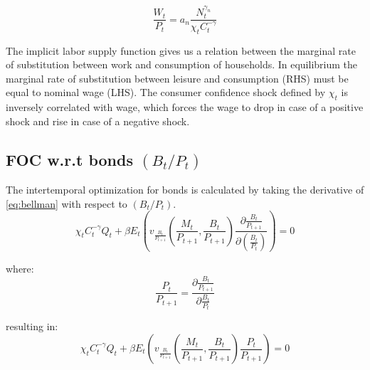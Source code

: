 \documentclass[10pt,a4paper]{article}
\begin{document}
\begin{equation}\label{eq:implicitLabor} 
\dfrac{W_{t}}{P_{t}} 
= 
a_{n} \dfrac{N_{t}^{\gamma_{n}}}{\chi_{t} C_{t}^{-\gamma}}
\end{equation}

The implicit labor supply function gives us a relation between the marginal rate of substitution between work and consumption of households. In equilibrium the marginal rate of substitution between leisure and consumption (RHS) must be equal to nominal wage (LHS). The consumer confidence shock defined by $\chi_{t}$ is inversely correlated with wage, which forces the wage to drop in case of a positive shock and rise in case of a negative shock.
\subsection{FOC w.r.t bonds $(B_{t}/P_{t})$}
The intertemporal optimization for bonds is calculated by taking the derivative of \eqref{eq:bellman} with respect to $(B_{t}/P_{t})$.
$$\chi_t C_t^{-\gamma} Q_{t} + \beta E_{t} \left( v_{\frac{B_t}{P_{t+1}}} \left(  \frac{M_t}{P_{t+1}}, \frac{B_t}{P_{t+1}}\right) \frac{\partial \frac{B_t}{P_{t+1}}}{\partial (\frac{B_t}{P_t})} \right)=0 $$

where:
$$ \frac{P_t}{P_{t+1}}= \frac{\partial \frac{B_t}{P_{t+1}}}{\partial \frac{B_t}{P_t}} $$

resulting in:
\begin{equation}\label{eq:8}
\chi_t C_t^{-\gamma} Q_{t} + \beta E_{t} \left( v_{\frac{B_t}{P_{t+1}}} \left(  \frac{M_t}{P_{t+1}}, \frac{B_t}{P_{t+1}}\right) \frac{P_{t}}{P_{t+1}} \right)=0
\end{equation}
\end{document}
